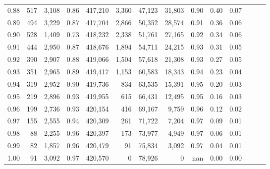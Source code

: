 \begin{tabular}{rrrrrrrrrrrrrr}
0.88 &     517 &  3,108 &  0.86 &  417,210 &    3,360 &  47,123 &  31,803 &  0.90 &  0.40 &      0.07 \\
0.89 &     494 &  3,229 &  0.87 &  417,704 &    2,866 &  50,352 &  28,574 &  0.91 &  0.36 &      0.06 \\
0.90 &     528 &  1,409 &  0.73 &  418,232 &    2,338 &  51,761 &  27,165 &  0.92 &  0.34 &      0.06 \\
0.91 &     444 &  2,950 &  0.87 &  418,676 &    1,894 &  54,711 &  24,215 &  0.93 &  0.31 &      0.05 \\
0.92 &     390 &  2,907 &  0.88 &  419,066 &    1,504 &  57,618 &  21,308 &  0.93 &  0.27 &      0.05 \\
0.93 &     351 &  2,965 &  0.89 &  419,417 &    1,153 &  60,583 &  18,343 &  0.94 &  0.23 &      0.04 \\
0.94 &     319 &  2,952 &  0.90 &  419,736 &      834 &  63,535 &  15,391 &  0.95 &  0.20 &      0.03 \\
0.95 &     219 &  2,896 &  0.93 &  419,955 &      615 &  66,431 &  12,495 &  0.95 &  0.16 &      0.03 \\
0.96 &     199 &  2,736 &  0.93 &  420,154 &      416 &  69,167 &   9,759 &  0.96 &  0.12 &      0.02 \\
0.97 &     155 &  2,555 &  0.94 &  420,309 &      261 &  71,722 &   7,204 &  0.97 &  0.09 &      0.01 \\
0.98 &      88 &  2,255 &  0.96 &  420,397 &      173 &  73,977 &   4,949 &  0.97 &  0.06 &      0.01 \\
0.99 &      82 &  1,857 &  0.96 &  420,479 &       91 &  75,834 &   3,092 &  0.97 &  0.04 &      0.01 \\
1.00 &      91 &  3,092 &  0.97 &  420,570 &        0 &  78,926 &       0 &   nan &  0.00 &      0.00 \\
\bottomrule
\end{tabular}
